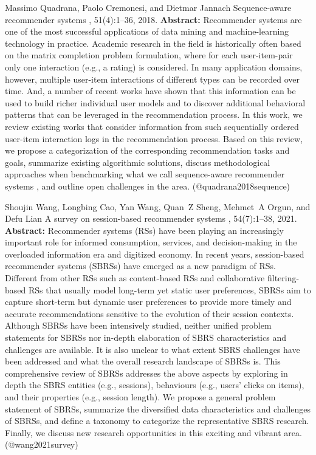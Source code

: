 \documentclass{article}
\begin{document}
\begin{thebibliography}{}
 Massimo Quadrana, Paolo Cremonesi, and Dietmar Jannach \newblock Sequence-aware recommender systems , 51(4):1--36, 2018. \newblock \textbf{Abstract:} Recommender systems are one of the most successful applications of data mining and machine-learning technology in practice. Academic research in the field is historically often based on the matrix completion problem formulation, where for each user-item-pair only one interaction (e.g., a rating) is considered. In many application domains, however, multiple user-item interactions of different types can be recorded over time. And, a number of recent works have shown that this information can be used to build richer individual user models and to discover additional behavioral patterns that can be leveraged in the recommendation process. In this work, we review existing works that consider information from such sequentially ordered user-item interaction logs in the recommendation process. Based on this review, we propose a categorization of the corresponding recommendation tasks and goals, summarize existing algorithmic solutions, discuss methodological approaches when benchmarking what we call sequence-aware recommender systems , and outline open challenges in the area. \newblock (@quadrana2018sequence)

 Shoujin Wang, Longbing Cao, Yan Wang, Quan~Z Sheng, Mehmet~A Orgun, and Defu Lian \newblock A survey on session-based recommender systems , 54(7):1--38, 2021. \newblock \textbf{Abstract:} Recommender systems (RSs) have been playing an increasingly important role for informed consumption, services, and decision-making in the overloaded information era and digitized economy. In recent years, session-based recommender systems (SBRSs) have emerged as a new paradigm of RSs. Different from other RSs such as content-based RSs and collaborative filtering-based RSs that usually model long-term yet static user preferences, SBRSs aim to capture short-term but dynamic user preferences to provide more timely and accurate recommendations sensitive to the evolution of their session contexts. Although SBRSs have been intensively studied, neither unified problem statements for SBRSs nor in-depth elaboration of SBRS characteristics and challenges are available. It is also unclear to what extent SBRS challenges have been addressed and what the overall research landscape of SBRSs is. This comprehensive review of SBRSs addresses the above aspects by exploring in depth the SBRS entities (e.g., sessions), behaviours (e.g., users’ clicks on items), and their properties (e.g., session length). We propose a general problem statement of SBRSs, summarize the diversified data characteristics and challenges of SBRSs, and define a taxonomy to categorize the representative SBRS research. Finally, we discuss new research opportunities in this exciting and vibrant area. \newblock (@wang2021survey)


\end{thebibliography}
\end{document}
